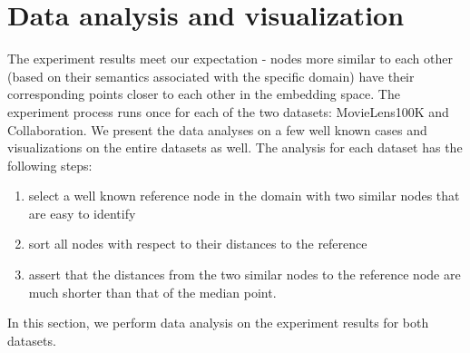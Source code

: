 \documentclass[conference]{IEEEtran}
\begin{document}
\section{Data analysis and visualization}
The experiment results meet our expectation - nodes more similar to each other (based on their semantics associated with the specific domain) have their corresponding points closer to each other in the embedding space.
The experiment process runs once for each of the two datasets: MovieLens100K and Collaboration.
We present the data analyses on a few well known cases and visualizations on the entire datasets as well.
The analysis for each dataset has the following steps:
\begin{enumerate}
	\item select a well known reference node in the domain with two similar nodes that are easy to identify
	\item sort all nodes with respect to their distances to the reference
	\item assert that the distances from the two similar nodes to the reference node are much shorter than that of the median point.
\end{enumerate}
In this section, we perform data analysis on the experiment results for both datasets.
\end{document}
